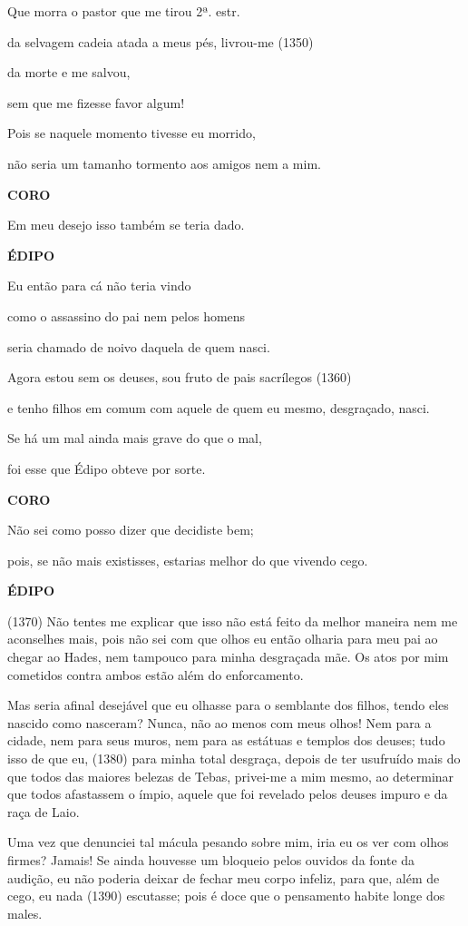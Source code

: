 Que morra o pastor que me tirou 2ª. estr.

da selvagem cadeia atada a meus pés, livrou-me (1350)

da morte e me salvou,

sem que me fizesse favor algum!

Pois se naquele momento tivesse eu morrido,

não seria um tamanho tormento aos amigos nem a mim.

\textbf{CORO}

Em meu desejo isso também se teria dado.

\textbf{ÉDIPO}

Eu então para cá não teria vindo

como o assassino do pai nem pelos homens

seria chamado de noivo daquela de quem nasci.

Agora estou sem os deuses, sou fruto de pais sacrílegos (1360)

e tenho filhos em comum com aquele de quem eu mesmo, desgraçado, nasci.

Se há um mal ainda mais grave do que o mal,

foi esse que Édipo obteve por sorte.

\textbf{CORO}

Não sei como posso dizer que decidiste bem;

pois, se não mais existisses, estarias melhor do que vivendo cego.

\textbf{ÉDIPO}

(1370) Não tentes me explicar que isso não está feito da melhor maneira
nem me aconselhes mais, pois não sei com que olhos eu então olharia para
meu pai ao chegar ao Hades, nem tampouco para minha desgraçada mãe. Os
atos por mim cometidos contra ambos estão além do enforcamento.

Mas seria afinal desejável que eu olhasse para o semblante dos filhos,
tendo eles nascido como nasceram? Nunca, não ao menos com meus olhos!
Nem para a cidade, nem para seus muros, nem para as estátuas e templos
dos deuses; tudo isso de que eu, (1380) para minha total desgraça,
depois de ter usufruído mais do que todos das maiores belezas de Tebas,
privei-me a mim mesmo, ao determinar que todos afastassem o ímpio,
aquele que foi revelado pelos deuses impuro e da raça de Laio.

Uma vez que denunciei tal mácula pesando sobre mim, iria eu os ver com
olhos firmes? Jamais! Se ainda houvesse um bloqueio pelos ouvidos da
fonte da audição, eu não poderia deixar de fechar meu corpo infeliz,
para que, além de cego, eu nada (1390) escutasse; pois é doce que o
pensamento habite longe dos males.

